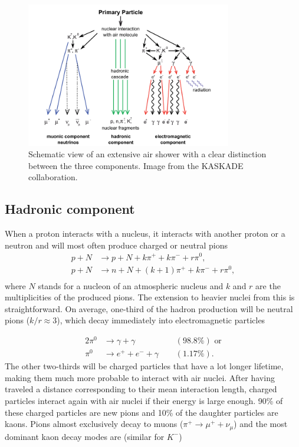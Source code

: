 \begin{figure}
\centering
\includegraphics[width=0.8\textwidth]{chapter3/img/airshower.png}
\caption{Schematic view of an extensive air shower with a clear distinction between the three components. Image from the KASKADE collaboration.}
\label{fig:airshower}
\end{figure} 

\subsection{Hadronic component}
When a proton interacts with a nucleus, it interacts with another proton or a neutron and will most often produce charged or neutral pions
\begin{equation}
\begin{split}
p+N &\rightarrow p+N + k\pi^+ + k\pi^- +r\pi^0,\\
p+N &\rightarrow n+N + (k+1)\pi^+ + k\pi^- + r\pi^0,\\
\end{split}
\end{equation}
where $N$ stands for a nucleon of an atmospheric nucleus and $k$ and $r$ are the multiplicities of the produced pions. The extension to heavier nuclei from this is straightforward. On average, one-third of the hadron production will be neutral pions ($k/r \approx 3$), which decay immediately into electromagnetic particles 

\begin{alignat}{2}
\pi^0 &\rightarrow \gamma  +\gamma &&(98.8\%) \textrm{ or}\\
\pi^0 &\rightarrow e^+ + e^- + \gamma \ \ &&(1.17\%).
\end{alignat}
The other two-thirds will be charged particles that have a lot longer lifetime, making them much more probable to interact with air nuclei. After having traveled a distance corresponding to their mean interaction length, charged particles interact again with air nuclei if their energy is large enough. 90\% of these charged particles are new pions and 10\% of the daughter particles are kaons. Pions almost exclusively decay to muons ($\pi^+ \rightarrow \mu^+ + \nu_{\mu}$) and the most dominant kaon decay modes are (similar for $K^-$) \cite{PDG2018url}

